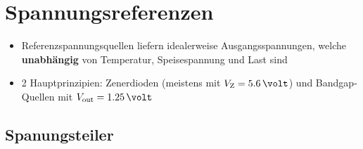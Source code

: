\section{Spannungsreferenzen}

\begin{itemize}
    \item Referenzspannungsquellen liefern idealerweise Ausgangsspannungen, welche \textbf{unabhängig} von 
        Temperatur, Speisespannung und Last sind
    \item 2 Hauptprinzipien: Zenerdioden (meistens mit $V_{\rm Z} = 5.6 \,\volt$) und Bandgap-Quellen mit $V_{\rm out} = 1.25 \, \volt$
\end{itemize}


\subsection{Spanungsteiler}

